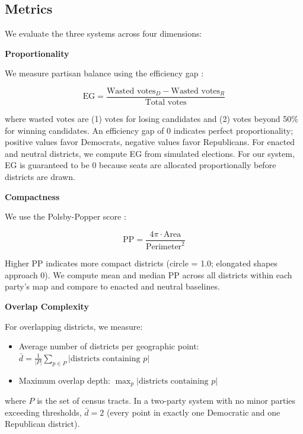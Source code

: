 \subsection{Metrics}

We evaluate the three systems across four dimensions:

\textbf{Proportionality}

We measure partisan balance using the efficiency gap \citep{stephanopoulos2015partisan}:

\begin{equation}
\text{EG} = \frac{\text{Wasted votes}_D - \text{Wasted votes}_R}{\text{Total votes}}
\end{equation}

where wasted votes are (1) votes for losing candidates and (2) votes beyond 50\% for winning candidates. An efficiency gap of 0 indicates perfect proportionality; positive values favor Democrats, negative values favor Republicans. For enacted and neutral districts, we compute EG from simulated elections. For our system, EG is guaranteed to be 0 because seats are allocated proportionally before districts are drawn.

\textbf{Compactness}

We use the Polsby-Popper score \citep{polsby1991third}:

\begin{equation}
\text{PP} = \frac{4\pi \cdot \text{Area}}{\text{Perimeter}^2}
\end{equation}

Higher PP indicates more compact districts (circle = 1.0; elongated shapes approach 0). We compute mean and median PP across all districts within each party's map and compare to enacted and neutral baselines.

\textbf{Overlap Complexity}

For overlapping districts, we measure:
\begin{itemize}
    \item Average number of districts per geographic point: $\bar{d} = \frac{1}{|P|}\sum_{p \in P} |\text{districts containing } p|$
    \item Maximum overlap depth: $\max_p |\text{districts containing } p|$
\end{itemize}

where $P$ is the set of census tracts. In a two-party system with no minor parties exceeding thresholds, $\bar{d} = 2$ (every point in exactly one Democratic and one Republican district).

